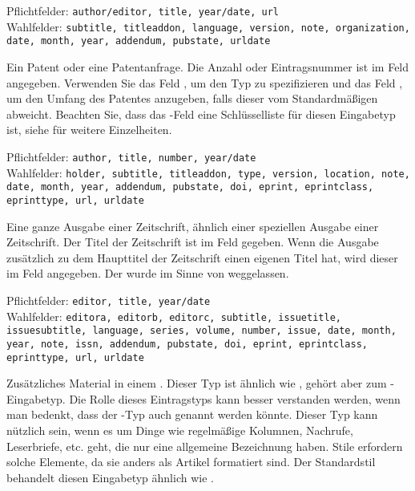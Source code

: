 \documentclass{ltxdockit}[2011/03/25]
\begin{document}
\begin{typelist}
Pflichtfelder: \texttt{author/editor, title, year/date, url}\\ Wahlfelder:
\texttt{subtitle, titleaddon,
language, version, note, organization, date, month, year, addendum, pubstate,
urldate}


Ein Patent oder eine Patentanfrage. Die Anzahl oder
Eintragsnummer ist im Feld  angegeben. Verwenden Sie das Feld
, um den Typ zu spezifizieren und das Feld ,
um den Umfang des Patentes anzugeben, falls dieser vom Standardmäßigen abweicht.
Beachten Sie, dass das -Feld eine Schlüsselliste für diesen
Eingabetyp ist, siehe  für weitere Einzelheiten. 

Pflichtfelder: \texttt{author, title, number, year/date}\\ Wahlfelder:
\texttt{holder, subtitle,
titleaddon, type, version, location, note, date, month, year, addendum,
pubstate, doi, eprint, eprintclass, eprint\-type, url, urldate}


Eine ganze Ausgabe einer Zeitschrift, ähnlich einer
speziellen Ausgabe einer Zeitschrift. Der Titel der Zeitschrift ist im Feld
 gegeben. Wenn die Ausgabe zusätzlich zu dem Haupttitel der
Zeitschrift einen eigenen Titel hat, wird dieser im Feld 
angegeben. Der  wurde im Sinne von 
weggelassen. 

Pflichtfelder: \texttt{editor, title, year/date}\\ Wahlfelder: \texttt{editora, editorb, 
editorc, subtitle,
issuetitle, issuesubtitle, language, series, volume, number, issue, date, month,
year, note, issn, addendum, pubstate, doi, eprint, eprintclass, eprinttype, url,
urldate}


Zusätzliches Material in einem . Dieser Typ ist ähnlich wie
, gehört aber zum -Eingabetyp. Die Rolle
dieses Eintragstyps kann besser verstanden werden, wenn man bedenkt, dass der
-Typ auch  genannt werden könnte. Dieser
Typ kann nützlich sein, wenn es um Dinge wie regelmäßige Kolumnen, Nachrufe,
Leserbriefe, etc. geht, die nur eine allgemeine Bezeichnung haben. Stile
erfordern solche Elemente, da sie anders als Artikel formatiert sind. Der
Standardstil behandelt diesen Eingabetyp ähnlich wie . 


\end{typelist}
\end{document}
